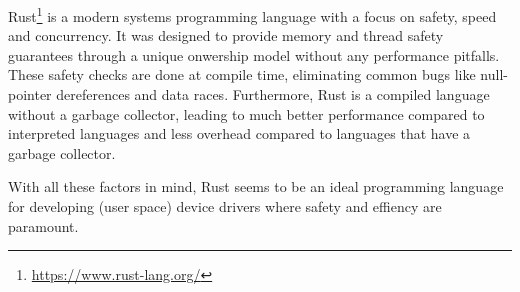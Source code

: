 Rust\footnote{\url{https://www.rust-lang.org/}} is a modern systems programming language with a focus on safety, speed and concurrency. It was designed to provide memory and thread safety guarantees through a unique onwership model without any performance pitfalls. These safety checks are done at compile time, eliminating common bugs like null-pointer dereferences and data races. Furthermore, Rust is a compiled language without a garbage collector, leading to much better performance compared to interpreted languages and less overhead compared to languages that have a garbage collector.

With all these factors in mind, Rust seems to be an ideal programming language for developing (user space) device drivers where safety and effiency are paramount.


